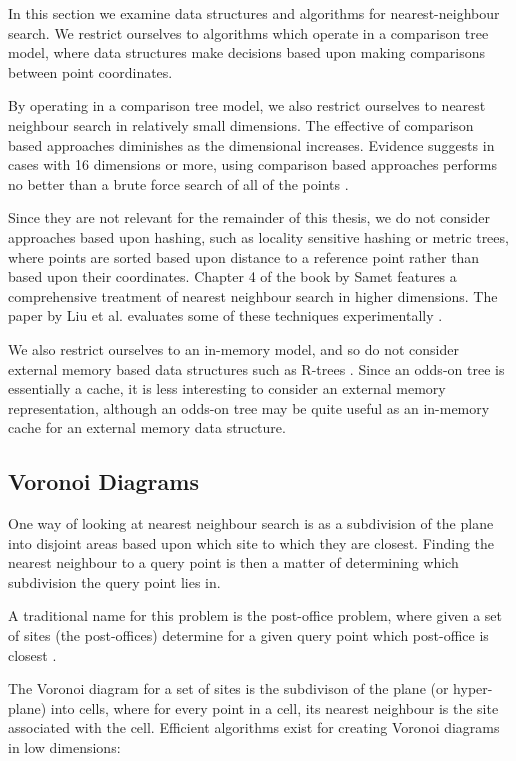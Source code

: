 \documentclass[mcs]{scsthesis}
\begin{document}
In this section we examine data structures and algorithms for nearest-neighbour
search. We restrict ourselves to algorithms which operate in a comparison tree
model, where data structures make decisions based upon making comparisons
between point coordinates.

By operating in a comparison tree model, we also restrict ourselves to nearest
neighbour search in relatively small dimensions. The effective of comparison
based approaches diminishes as the dimensional increases. Evidence suggests in
cases with 16 dimensions or more, using comparison based approaches performs no
better than a brute force search of all of the points \cite{fastvector}.

Since they are not relevant for the remainder of this thesis, we do not consider
approaches based upon hashing, such as locality sensitive hashing \cite{lsh}
or metric trees, where points are sorted based upon distance to a reference
point rather than based upon their coordinates. Chapter 4 of the book by Samet
\cite{samet} features a comprehensive treatment of nearest neighbour search in
higher dimensions. The paper by Liu et al. evaluates some of these techniques
experimentally \cite{practicalann}. 

We also restrict ourselves to an in-memory model, and so do not consider
external memory based data structures such as R-trees \cite{rtree}. Since an
odds-on tree is essentially a cache, it is less interesting to consider an
external memory representation, although an odds-on tree may be quite useful
as an in-memory cache for an external memory data structure.

\subsection{Voronoi Diagrams}

One way of looking at nearest neighbour search is as a subdivision of the plane
into disjoint areas based upon which site to which they are closest. Finding
the nearest neighbour to a query point is then a matter of determining which
subdivision the query point lies in.

A traditional name for this problem is the post-office problem, where given a
set of sites (the post-offices) determine for a given query point which
post-office is closest \cite{dutch}.

The Voronoi diagram for a set of sites is the subdivison of the plane (or
hyper-plane) into cells, where for every point in a cell, its nearest neighbour
is the site associated with the cell. Efficient algorithms exist for creating
Voronoi diagrams in low dimensions:
\end{document}
